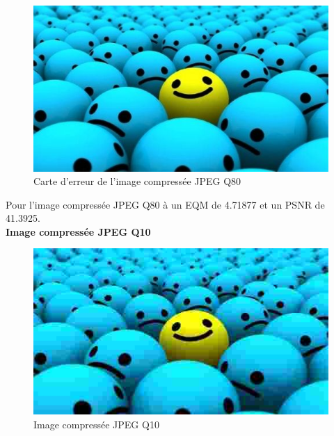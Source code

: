 \documentclass[12pt]{report}
\begin{document}
\begin{figure}[H]
\begin{center}
\includegraphics[scale=0.5]{../smileyDegQ80.jpg} 
\caption{Carte d'erreur de l'image compressée JPEG Q80 }
\end{center}
\end{figure}

Pour l'image compressée JPEG Q80 à un EQM de 4.71877 et un PSNR de 41.3925.\\

\textbf{Image compressée JPEG Q10}

\begin{figure}[H]
\begin{center}
\includegraphics[scale=0.5]{../smileyDegQ10.jpg} 
\caption{Image compressée JPEG Q10 }
\end{center}
\end{figure}
\end{document}
